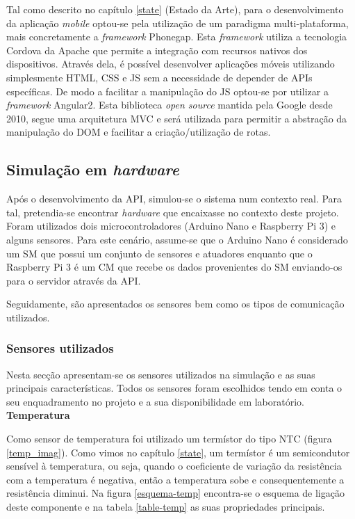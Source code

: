 \newpage


Tal como descrito no capítulo \ref{state} (Estado da Arte), para o desenvolvimento da aplicação \textit{mobile} optou-se pela utilização de um paradigma multi-plataforma, mais concretamente a \textit{framework} Phonegap. Esta \textit{framework} utiliza a tecnologia Cordova da Apache que permite a integração com recursos nativos dos dispositivos. Através dela, é possível desenvolver aplicações móveis utilizando simplesmente \ac{HTML}, \ac{CSS} e \ac{JS} sem a necessidade de depender de APIs específicas. De modo a facilitar a manipulação do \ac{JS} optou-se por utilizar a \textit{framework} Angular2. Esta biblioteca \textit{open source} mantida pela Google desde 2010, segue uma arquitetura \ac{MVC} e será utilizada para permitir a abstração da manipulação do \ac{DOM} e facilitar a criação/utilização de rotas\cite{Google2015}.



\newpage
\subsection{Simulação em \textit{hardware}}
\label{arq-hardw}


Após o desenvolvimento da \ac{API}, simulou-se o sistema num contexto real. Para tal, pretendia-se encontrar \textit{hardware} que encaixasse no contexto deste projeto. Foram utilizados dois microcontroladores (Arduino Nano e Raspberry Pi 3) e alguns sensores. Para este cenário, assume-se que o Arduino Nano é considerado um \acl{SM} que possui um conjunto de sensores e atuadores enquanto que o Raspberry Pi 3 é um \acl{CM} que recebe os dados provenientes do \acl{SM} enviando-os para o servidor através da API.  

Seguidamente, são apresentados os sensores bem como os tipos de comunicação utilizados. 
 

\subsubsection{Sensores utilizados}

Nesta secção apresentam-se os sensores utilizados na simulação e as suas principais características. Todos os sensores foram escolhidos tendo em conta o seu enquadramento no projeto e a sua disponibilidade em laboratório. \\


\textbf{Temperatura}


Como sensor de temperatura foi utilizado um termístor do tipo \ac{NTC} (figura \ref{temp_imag}). Como vimos no capítulo \ref{state}, um termístor é um semicondutor sensível à temperatura, ou seja, quando o coeficiente de variação da resistência com a temperatura é negativa, então a temperatura sobe e consequentemente a resistência diminui. Na figura \ref{esquema-temp} encontra-se o esquema de ligação deste componente e na tabela \ref{table-temp} as suas propriedades principais\cite{temp-dta}. 


